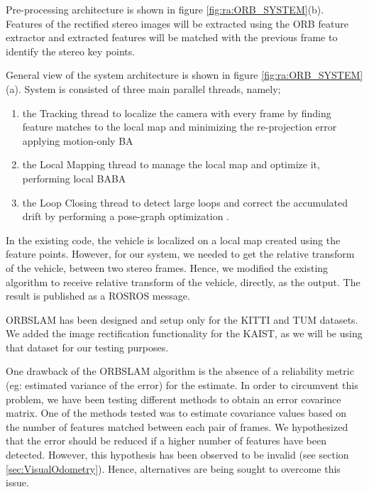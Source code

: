 Pre-processing architecture is shown in figure \ref{fig:ra:ORB_SYSTEM}(b). Features of the rectified stereo images will be extracted using the ORB feature extractor \cite{ra:ORB} and extracted features will be matched with the previous frame to identify the stereo key points. 

General view of the system architecture is shown in figure \ref{fig:ra:ORB_SYSTEM}(a). System is consisted of three main parallel threads, namely;
\begin{enumerate}
	\item the Tracking thread to localize the camera with every frame by finding feature matches to the local map and minimizing the re-projection error applying motion-only \gls{BA}
	\item the Local Mapping thread to manage the local map and optimize it, performing local BA\gls{BA}
	\item the Loop Closing thread to detect large loops and correct the accumulated drift by performing a pose-graph optimization \cite{ra:ORB_SLAM2}.
\end{enumerate} 

In the existing code, the vehicle is localized on a local map created using the feature points. However, for our system, we needed to get the relative transform of the vehicle, between two stereo frames. Hence, we modified the existing algorithm to receive relative transform of the vehicle, directly, as the output. The result is published as a ROS\gls{ROS} message.

\gls{ORBSLAM} has been designed and setup only for the \gls{KITTI} and \gls{TUM} datasets. We added the image rectification functionality for the \gls{KAIST}, as we will be using that dataset for our testing purposes.

One drawback of the \gls{ORBSLAM} algorithm is the absence of a reliability metric (eg: estimated variance of the error) for the estimate. In order to circumvent this problem, we have been testing different methods to obtain an error covarince matrix. One of the methods tested was to estimate covariance values based on the number of features matched between each pair of frames. We hypothesized that the error should be reduced if a higher number of features have been detected. However, this hypothesis has been observed to be invalid (see section \ref{sec:VisualOdometry}). Hence, alternatives are being sought to overcome this issue. 










